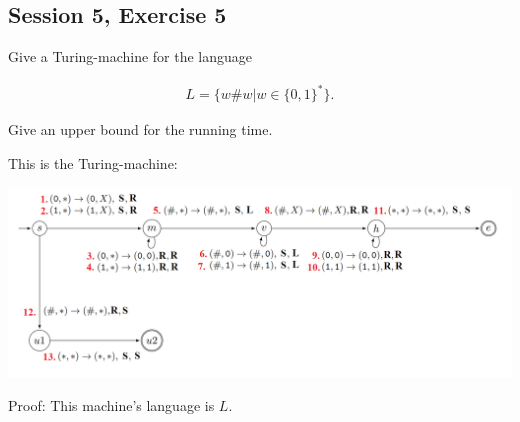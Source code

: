 \subsection {Session 5, Exercise 5}

\label{6f5}


Give a Turing-machine for the language

\begin{align*}
 L = \{w\#w | w \in{} \{0,1\}^*\}.
\end{align*}

Give an upper bound for the running time.


This is the Turing-machine:

\includegraphics[width=\linewidth]{05/6_5.png}

Proof: This machine's language is $L$.

